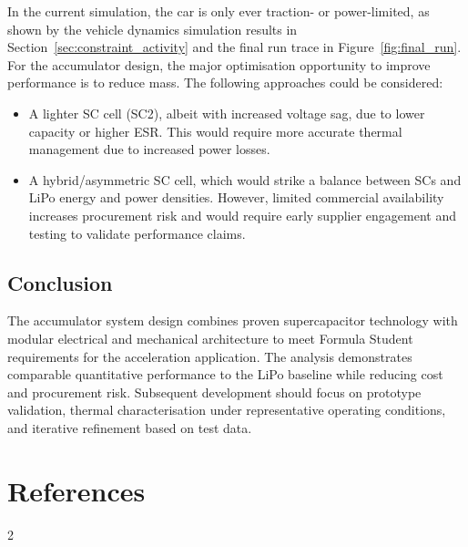 \documentclass[11pt, a4paper]{report}
\numberwithin{equation}{section}
\newcommand{\compactbib}{%
  \vspace{-16pt}%
  \enlargethispage{20pt}%
  \section*{References}%
  \vspace{-33pt}%
  \begingroup
    \begin{singlespace}%
      \begin{multicols}{2}%
        \scriptsize
        \setlength{\bibitemsep}{0pt}%
        \printbibliography[heading=none]%
      \end{multicols}%
    \end{singlespace}%
  \endgroup
}
\begin{document}
\begin{refsection}
In the current simulation, the car is only ever traction- or power-limited, as shown by the vehicle dynamics simulation results in Section~\ref{sec:constraint_activity} and the final run trace in Figure~\ref{fig:final_run}. For the accumulator design, the major optimisation opportunity to improve performance is to reduce mass. The following approaches could be considered:
\begin{itemize}
    \item A lighter SC cell (SC2), albeit with increased voltage sag, due to lower capacity or higher ESR. This would require more accurate thermal management due to increased power losses.
    \item A hybrid/asymmetric SC cell, which would strike a balance between SCs and LiPo energy and power densities. However, limited commercial availability increases procurement risk and would require early supplier engagement and testing to validate performance claims.
\end{itemize}

\subsection{Conclusion}
The accumulator system design combines proven supercapacitor technology with modular electrical and mechanical architecture to meet Formula Student requirements for the acceleration application. The analysis demonstrates comparable quantitative performance to the LiPo baseline while reducing cost and procurement risk. Subsequent development should focus on prototype validation, thermal characterisation under representative operating conditions, and iterative refinement based on test data.

\compactbib
\end{refsection}
\end{document}
